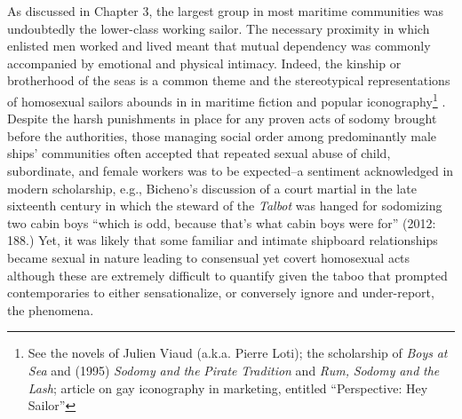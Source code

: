   As discussed in Chapter 3, the largest group in most maritime communities was undoubtedly the lower-class working sailor. The necessary proximity in which enlisted men worked and lived meant that mutual dependency was commonly accompanied by emotional and physical intimacy. Indeed, the kinship or brotherhood of the seas is a common theme and the stereotypical representations of homosexual sailors abounds in in maritime fiction and popular iconography\footnote{See the novels of Julien Viaud (a.k.a. Pierre Loti); the scholarship of  \textit{Boys} \textit{at} \textit{Sea} and (1995) \textit{Sodomy} \textit{and} \textit{the} \textit{Pirate} \textit{Tradition} and  \textit{Rum,} \textit{Sodomy} \textit{and} \textit{the} \textit{Lash};  article on gay iconography in marketing, entitled “Perspective: Hey Sailor”} . Despite the harsh punishments in place for any proven acts of sodomy brought before the authorities, those managing social order among predominantly male ships’ communities often accepted that repeated sexual abuse of child, subordinate, and female workers was to be expected--a sentiment acknowledged in modern scholarship, e.g., Bicheno’s discussion of a court martial in the late sixteenth century in which the steward of the \textit{Talbot} was hanged for sodomizing two cabin boys “which is odd, because that’s what cabin boys were for” (2012: 188.) Yet, it was likely that some familiar and intimate shipboard relationships became sexual in nature leading to consensual yet covert homosexual acts although these are extremely difficult to quantify given the taboo that prompted contemporaries to either sensationalize, or conversely ignore and under-report, the phenomena. 

